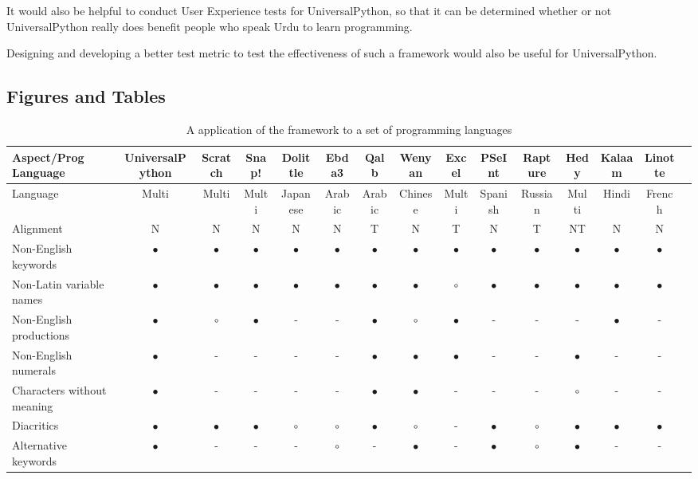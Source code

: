 \documentclass[conference]{IEEEtran}
\begin{document}
It would also be helpful to conduct User Experience tests for UniversalPython, so that it can be determined whether or not UniversalPython really does benefit people who speak Urdu to learn programming.

Designing and developing a better test metric to test the effectiveness of such a framework would also be useful for UniversalPython.

\subsection{Figures and Tables}


\begin{table}[t]
\caption{A application of the framework to a set of programming languages}
\centering
\begin{tabularx}{\textwidth}{l *{14}{c}}
\hline
Aspect/Prog Language & UniversalPython & Scratch & Snap! & Dolittle & Ebda3 & Qalb & Wenyan & Excel & PSeInt & Rapture & Hedy & Kalaam & Linotte \\
\hline
Language & Multi & Multi & Multi & Japanese & Arabic & Arabic & Chinese & Multi & Spanish & Russian & Multi & Hindi & French \\
Alignment & N & N & N & N & N & T & N & T & N & T & NT & N & N \\
Non-English keywords & $\bullet$ & $\bullet$ & $\bullet$ & $\bullet$ & $\bullet$ & $\bullet$ & $\bullet$ & $\bullet$ & $\bullet$ & $\bullet$ & $\bullet$ & $\bullet$ & $\bullet$ \\
Non-Latin variable names & $\bullet$ & $\bullet$ & $\bullet$ & $\bullet$ & $\bullet$ & $\bullet$ & $\bullet$ & $\circ$ & $\bullet$ & $\bullet$ & $\bullet$ & $\bullet$ & $\bullet$ \\
Non-English productions & $\bullet$ & $\circ$ & $\bullet$ & - & - & $\bullet$ & $\circ$ & $\bullet$ & - & - & - & $\bullet$ & - \\
Non-English numerals & $\bullet$ & - & - & - & - & $\bullet$ & $\bullet$ & $\bullet$ & - & - & $\bullet$ & - & - \\
Characters without meaning & $\bullet$ & - & - & - & - & $\bullet$ & $\bullet$ & - & - & - & $\circ$ & - & - \\
Diacritics & $\bullet$ & $\bullet$ & $\bullet$ & $\circ$ & $\circ$ & $\bullet$ & $\circ$ & - & $\bullet$ & $\circ$ & $\bullet$ & $\bullet$ & $\bullet$ \\
Alternative keywords & $\bullet$ & - & - & - & $\circ$ & - & $\bullet$ & - & $\bullet$ & $\circ$ & $\bullet$ & - & - \\

\end{tabularx}
\end{table}
\end{document}

